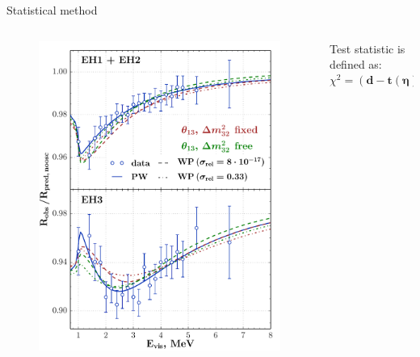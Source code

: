 \documentclass[usenames, dvipsnames]{beamer}
\begin{document}
\begin{frame}[fragile]
\begin{columns}[T]
\begin{column}{.47\textwidth}
\begin{block}{Statistical method}
    \begin{columns}[T]
        \begin{column}{0.47\textwidth}
            \vspace*{-1cm}
            \begin{figure}
                \includegraphics[scale=1.22]{./pics/EH-ratio_5sigma-s_double-EH_bold.pdf}
            \end{figure}
        \end{column}
        \hspace*{1.5cm}
        \begin{column}{0.47\textwidth}
              Test statistic is defined as:
                    \begin{equation*}
                        \chi^2 = (\mathbf{d} -
                            \mathbf{t} (\boldsymbol{\eta}))^T V^{-1}(\mathbf{d} -
                            \mathbf{t} (\boldsymbol{\eta}))
                    \end{equation*} 

\end{column}
\end{columns}
\end{block}
\end{column}
\end{columns}
\end{frame}
\end{document}
